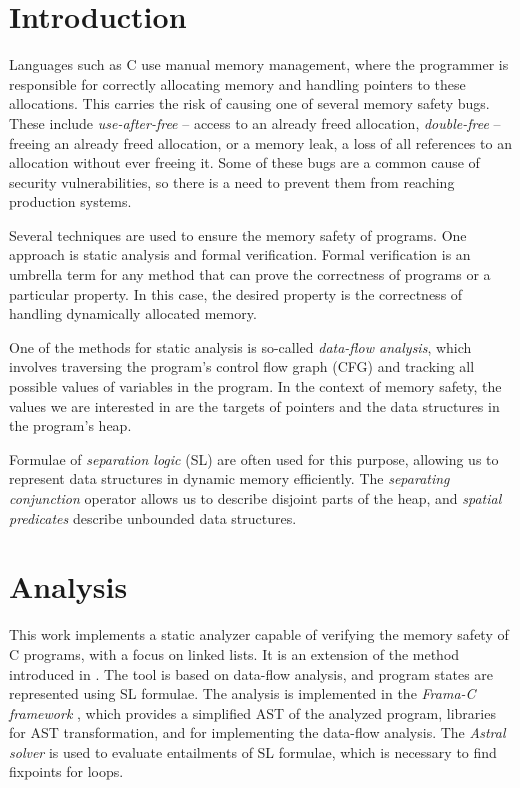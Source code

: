 \documentclass{ExcelAtFIT}
\affiliation{*%
  \href{mailto:xbrabl04@stud.fit.vutbr.cz}{xbrabl04@stud.fit.vutbr.cz},
  \textit{Faculty of Information Technology, Brno University of Technology}}
\begin{document}
\startdocument

\section{Introduction}

Languages such as C use manual memory management, where the programmer is responsible for correctly allocating memory and handling pointers to these allocations. This carries the risk of causing one of several memory safety bugs. These include \textit{use-after-free} -- access to an already freed allocation, \textit{double-free} -- freeing an already freed allocation, or a memory leak, a loss of all references to an allocation without ever freeing it. Some of these bugs are a common cause of security vulnerabilities, so there is a need to prevent them from reaching production systems.

Several techniques are used to ensure the memory safety of programs. One approach is static analysis and formal verification. Formal verification is an umbrella term for any method that can prove the correctness of programs or a particular property. In this case, the desired property is the correctness of handling dynamically allocated memory.

One of the methods for static analysis is so-called \textit{data-flow analysis}, which involves traversing the program's control flow graph (CFG) and tracking all possible values of variables in the program. In the context of memory safety, the values we are interested in are the targets of pointers and the data structures in the program's heap. 

Formulae of \textit{separation logic} (SL) \cite{SL, SL2} are often used for this purpose, allowing us to represent data structures in dynamic memory efficiently.  The \textit{separating conjunction} operator allows us to describe disjoint parts of the heap, and \textit{spatial predicates} describe unbounded data structures.

\section{Analysis}

This work implements a static analyzer capable of verifying the memory safety of C programs, with a focus on linked lists. It is an extension of the method introduced in \cite{shape_analysis}. The tool is based on data-flow analysis, and program states are represented using SL formulae. The analysis is implemented in the \textit{Frama-C framework} \cite{frama_c}, which provides a simplified AST of the analyzed program, libraries for AST transformation, and for implementing the data-flow analysis. The \textit{Astral solver} \cite{astral} is used to evaluate entailments of SL formulae, which is necessary to find fixpoints for loops.
\end{document}
